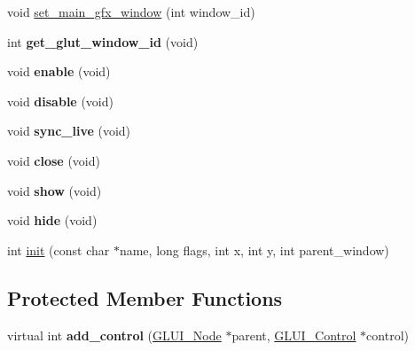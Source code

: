 \begin{DoxyCompactItemize}
\item 
void \hyperlink{classGLUI_adbf3736dbd0334a33677eae1a4baa8b9}{set\-\_\-main\-\_\-gfx\-\_\-window} (int window\-\_\-id)
\item 
\hypertarget{classGLUI_abf85807ffaab858e84c4e06924fad0da}{int {\bfseries get\-\_\-glut\-\_\-window\-\_\-id} (void)}\label{classGLUI_abf85807ffaab858e84c4e06924fad0da}

\item 
\hypertarget{classGLUI_abb1c2dc07fbe72c58f4d9340980168a1}{void {\bfseries enable} (void)}\label{classGLUI_abb1c2dc07fbe72c58f4d9340980168a1}

\item 
\hypertarget{classGLUI_a0007f929ed29394f37b6032578929878}{void {\bfseries disable} (void)}\label{classGLUI_a0007f929ed29394f37b6032578929878}

\item 
\hypertarget{classGLUI_a0be00b9a4f51c8d37a90ff1258c0fc76}{void {\bfseries sync\-\_\-live} (void)}\label{classGLUI_a0be00b9a4f51c8d37a90ff1258c0fc76}

\item 
\hypertarget{classGLUI_a3d37cab3ab684fd10e2f79dd9dcf7d27}{void {\bfseries close} (void)}\label{classGLUI_a3d37cab3ab684fd10e2f79dd9dcf7d27}

\item 
\hypertarget{classGLUI_a1e1ca1995e99922caae9e7df493187f9}{void {\bfseries show} (void)}\label{classGLUI_a1e1ca1995e99922caae9e7df493187f9}

\item 
\hypertarget{classGLUI_a30c59771996d05b301caea963051e7bc}{void {\bfseries hide} (void)}\label{classGLUI_a30c59771996d05b301caea963051e7bc}

\item 
int \hyperlink{classGLUI_a130870067b12b7228da501dae36be013}{init} (const char $\ast$name, long flags, int x, int y, int parent\-\_\-window)
\end{DoxyCompactItemize}
\subsection*{Protected Member Functions}
\begin{DoxyCompactItemize}
\item 
\hypertarget{classGLUI_a293fdf48459c281e466781ec9c559c21}{virtual int {\bfseries add\-\_\-control} (\hyperlink{classGLUI__Node}{G\-L\-U\-I\-\_\-\-Node} $\ast$parent, \hyperlink{classGLUI__Control}{G\-L\-U\-I\-\_\-\-Control} $\ast$control)}\label{classGLUI_a293fdf48459c281e466781ec9c559c21}

\end{DoxyCompactItemize}

